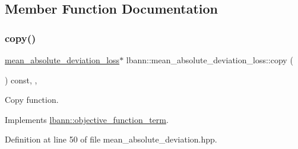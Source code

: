 \subsection{Member Function Documentation}
\mbox{\label{classlbann_1_1mean__absolute__deviation__loss_ad35925ead0532d7893fa9659398ccd45}} 
\subsubsection{\texorpdfstring{copy()}{copy()}}
{\footnotesize\ttfamily \hyperlink{classlbann_1_1mean__absolute__deviation__loss}{mean\+\_\+absolute\+\_\+deviation\+\_\+loss}$\ast$ lbann\+::mean\+\_\+absolute\+\_\+deviation\+\_\+loss\+::copy (\begin{DoxyParamCaption}{ }\end{DoxyParamCaption}) const\hspace{0.3cm}{\ttfamily [inline]}, {\ttfamily [override]}, {\ttfamily [virtual]}}

Copy function. 

Implements \hyperlink{classlbann_1_1objective__function__term_ae98a4ec173a602ad55d1df20dadd4cb9}{lbann\+::objective\+\_\+function\+\_\+term}.



Definition at line 50 of file mean\+\_\+absolute\+\_\+deviation.\+hpp.


